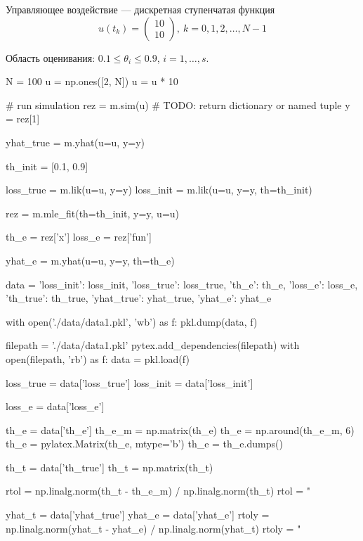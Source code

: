 \documentclass[a4paper,14pt]{extarticle}
\begin{document}
\indent Управляющее воздействие --- дискретная ступенчатая функция
\[
  u(t_k) = \begin{pmatrix} 10 \\ 10 \end{pmatrix},\ k = 0, 1, 2, \ldots, N-1
\]

Область оценивания: $0.1 \le \theta_i \le 0.9$, $i = 1, \ldots, s$.

\begin{pycode}[model1]
N = 100
u = np.ones([2, N])
u = u * 10

# run simulation
rez = m.sim(u)  # TODO: return dictionary or named tuple
y = rez[1]

yhat_true = m.yhat(u=u, y=y)

th_init = [0.1, 0.9]

loss_true = m.lik(u=u, y=y)
loss_init = m.lik(u=u, y=y, th=th_init)

rez = m.mle_fit(th=th_init, y=y, u=u)

th_e = rez['x']
loss_e = rez['fun']

yhat_e = m.yhat(u=u, y=y, th=th_e)

data = {'loss_init': loss_init,
        'loss_true': loss_true,
        'th_e': th_e,
        'loss_e': loss_e,
        'th_true': th_true,
        'yhat_true': yhat_true,
        'yhat_e': yhat_e}

with open('./data/data1.pkl', 'wb') as f:
  pkl.dump(data, f)
\end{pycode}

\begin{pycode}
filepath = './data/data1.pkl'
pytex.add_dependencies(filepath)
with open(filepath, 'rb') as f:
    data = pkl.load(f)

loss_true = data['loss_true']
loss_init = data['loss_init']

loss_e = data['loss_e']

th_e = data['th_e']
th_e_m = np.matrix(th_e)
th_e = np.around(th_e_m, 6)
th_e = pylatex.Matrix(th_e, mtype='b')
th_e = th_e.dumps()

th_t = data['th_true']
th_t = np.matrix(th_t)

rtol = np.linalg.norm(th_t - th_e_m) / np.linalg.norm(th_t)
rtol = "%

yhat_t = data['yhat_true']
yhat_e = data['yhat_e']
rtoly = np.linalg.norm(yhat_t - yhat_e) / np.linalg.norm(yhat_t)
rtoly = "%
\end{pycode}
\end{document}
